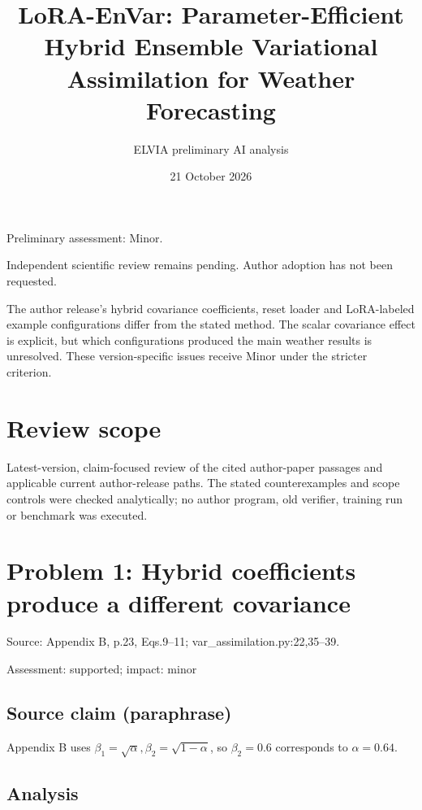 \documentclass[11pt]{article}
\begin{document}
\title{LoRA-EnVar: Parameter-Efficient Hybrid Ensemble Variational Assimilation for Weather Forecasting}

\author{ELVIA preliminary AI analysis}\date{21 October 2026}\maketitle

Preliminary assessment: Minor.\par

Independent scientific review remains pending. Author adoption has not been requested.

The author release's hybrid covariance coefficients, reset loader and LoRA-labeled example configurations differ from the stated method. The scalar covariance effect is explicit, but which configurations produced the main weather results is unresolved. These version-specific issues receive Minor under the stricter criterion.

\section*{Review scope}

Latest-version, claim-focused review of the cited author-paper passages and applicable current author-release paths. The stated counterexamples and scope controls were checked analytically; no author program, old verifier, training run or benchmark was executed.

\section*{Problem 1: Hybrid coefficients produce a different covariance}

Source: Appendix B, p.23, Eqs.9–11; var\_assimilation.py:22,35–39.

Assessment: supported; impact: minor

\subsection*{Source claim (paraphrase)}

Appendix B uses \(\beta_1=\sqrt\alpha,\beta_2=\sqrt{1-\alpha}\), so \(\beta_2=0.6\) corresponds to \(\alpha=0.64\).

\subsection*{Analysis}
\end{document}
